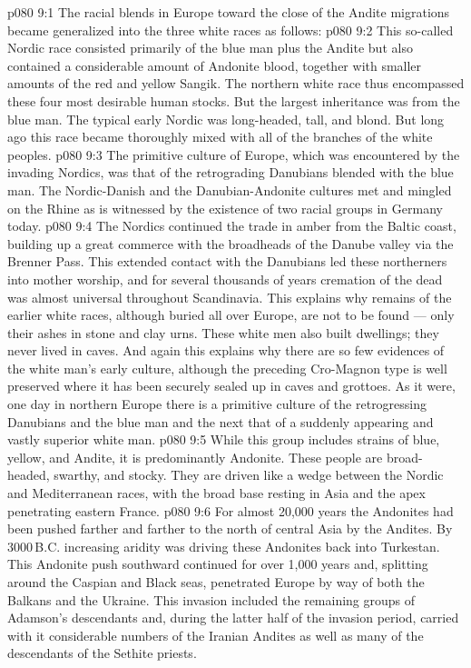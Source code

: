 \vs p080 9:1 The racial blends in Europe toward the close of the Andite migrations became generalized into the three white races as follows:
\vs p080 9:2 \bibnobreakspace {} This so\hyp{}called Nordic race consisted primarily of the blue man plus the Andite but also contained a considerable amount of Andonite blood, together with smaller amounts of the red and yellow Sangik. The northern white race thus encompassed these four most desirable human stocks. But the largest inheritance was from the blue man. The typical early Nordic was long\hyp{}headed, tall, and blond. But long ago this race became thoroughly mixed with all of the branches of the white peoples.
\vs p080 9:3 The primitive culture of Europe, which was encountered by the invading Nordics, was that of the retrograding Danubians blended with the blue man. The Nordic\hyp{}Danish and the Danubian\hyp{}Andonite cultures met and mingled on the Rhine as is witnessed by the existence of two racial groups in Germany today.
\vs p080 9:4 The Nordics continued the trade in amber from the Baltic coast, building up a great commerce with the broadheads of the Danube valley via the Brenner Pass. This extended contact with the Danubians led these northerners into mother worship, and for several thousands of years cremation of the dead was almost universal throughout Scandinavia. This explains why remains of the earlier white races, although buried all over Europe, are not to be found --- only their ashes in stone and clay urns. These white men also built dwellings; they never lived in caves. And again this explains why there are so few evidences of the white man’s early culture, although the preceding Cro\hyp{}Magnon type is well preserved where it has been securely sealed up in caves and grottoes. As it were, one day in northern Europe there is a primitive culture of the retrogressing Danubians and the blue man and the next that of a suddenly appearing and vastly superior white man.
\vs p080 9:5 \bibnobreakspace {} While this group includes strains of blue, yellow, and Andite, it is predominantly Andonite. These people are broad\hyp{}headed, swarthy, and stocky. They are driven like a wedge between the Nordic and Mediterranean races, with the broad base resting in Asia and the apex penetrating eastern France.
\vs p080 9:6 For almost 20,000 years the Andonites had been pushed farther and farther to the north of central Asia by the Andites. By 3000\,B.C. increasing aridity was driving these Andonites back into Turkestan. This Andonite push southward continued for over 1,000 years and, splitting around the Caspian and Black seas, penetrated Europe by way of both the Balkans and the Ukraine. This invasion included the remaining groups of Adamson’s descendants and, during the latter half of the invasion period, carried with it considerable numbers of the Iranian Andites as well as many of the descendants of the Sethite priests.
